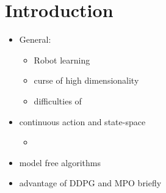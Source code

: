 \section{Introduction}

\begin{itemize}
	\item General:
	\begin{itemize}
		\item Robot learning
		\item curse of high dimensionality
		\item difficulties of 
	\end{itemize}
	\item continuous action and state-space
	\begin{itemize}
		\item
	\end{itemize}
	\item model free algorithms
	\item advantage of DDPG \cite{Lillicrap2015} and MPO \cite{Abdolmaleki2018a} briefly
\end{itemize}